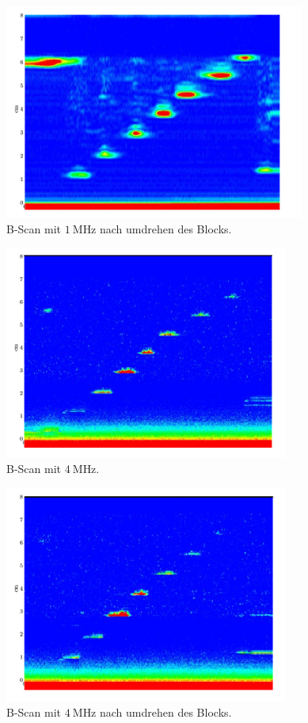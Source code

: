 \documentclass[
  bibliography=totoc,     %
  captions=tableheading,  %
  titlepage=firstiscover, %
]{scrartcl}
\begin{document}
\begin{figure}[H]
  \centering
  \includegraphics[width=0.88\textwidth]{B-Scan1Mhz2.png}
  \caption{B-Scan mit $\SI{1}{\mega\hertz}$ nach umdrehen des Blocks.}
  \label{fig:B-Scan2}
\end{figure}
\begin{figure}[H]
  \centering
  \includegraphics[width=0.83\textwidth]{B-Scan4MHz1.png}
  \caption{B-Scan mit $\SI{4}{\mega\hertz}$.}
  \label{fig:B-Scan3}
\end{figure}
\begin{figure}[H]
  \centering
  \includegraphics[width=0.83\textwidth]{B-Scan4MHz2.png}
  \caption{B-Scan mit $\SI{4}{\mega\hertz}$ nach umdrehen des Blocks.}
  \label{fig:B-Scan4}
\end{figure}
\end{document}
